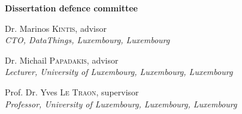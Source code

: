 \begin{adjustwidth*}{1em}{1em}

\noindent
\textbf{\large Dissertation defence committee}


\vspace{0.2cm}
\noindent
Dr.  Marinos \textsc{Kintis}, advisor\\
{\small \emph{CTO, DataThings, Luxembourg, Luxembourg}}   

\vspace{0.2cm}
\noindent
Dr. Michail \textsc{Papadakis}, advisor\\
{\small \emph{Lecturer, University of Luxembourg, Luxembourg, Luxembourg}}   

\vspace{0.2cm}
\noindent
Prof. Dr. Yves \textsc{Le Traon}, supervisor\\
{\small \emph{Professor, University of Luxembourg, Luxembourg, Luxembourg}}

\end{adjustwidth*}

\restoregeometry